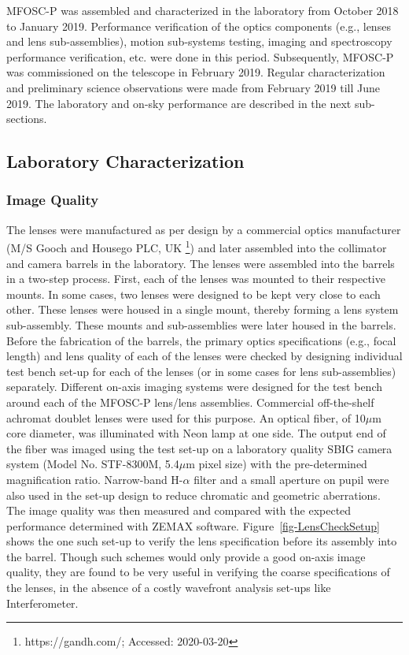 MFOSC-P was assembled and characterized in the laboratory from October 2018 to January 2019. Performance verification of the optics components (e.g., lenses and lens sub-assemblies), motion sub-systems testing, imaging and spectroscopy performance verification, etc. were done in this period. Subsequently, MFOSC-P was commissioned on the telescope in February 2019. Regular characterization and preliminary science observations were made from February 2019 till June 2019. The laboratory and on-sky performance are described in the next sub-sections.



\par
\subsection{Laboratory Characterization} 
\label{subsec-LabCharact}
\par


\par
\subsubsection{Image Quality} 
\label{subsubsec-LabIQ}
\par

The lenses were manufactured as per design by a commercial optics manufacturer (M/S Gooch and Housego PLC, UK \footnote{https://gandh.com/; Accessed: 2020-03-20}) and later assembled into the collimator and camera barrels in the laboratory. The lenses were assembled into the barrels in a two-step process. First, each of the lenses was mounted to their respective mounts. In some cases, two lenses were designed to be kept very close to each other. These lenses were housed in a single mount, thereby forming a lens system sub-assembly.  These mounts and sub-assemblies were later housed in the barrels. Before the fabrication of the barrels, the primary optics specifications (e.g., focal length) and lens quality of each of the lenses were checked by designing individual test bench set-up for each of the lenses (or in some cases for lens sub-assemblies) separately. Different on-axis imaging systems were designed for the test bench around each of the MFOSC-P lens/lens assemblies. Commercial off-the-shelf achromat doublet lenses were used for this purpose. An optical fiber, of 10$\mu$m core diameter, was illuminated with Neon lamp at one side. The output end of the fiber was imaged using the test set-up on a laboratory quality SBIG camera system (Model No. STF-8300M, 5.4$\mu$m pixel size) with the pre-determined magnification ratio. Narrow-band H-$\alpha$ filter and a small aperture on pupil were also used in the set-up design to reduce chromatic and geometric aberrations. The image quality was then measured and compared with the expected performance determined with ZEMAX software. Figure~\ref{fig-LensCheckSetup} shows the one such set-up to verify the lens specification before its assembly into the barrel. Though such schemes would only provide a good on-axis image quality, they are found to be very useful in verifying the coarse specifications of the lenses, in the absence of a costly wavefront analysis set-ups like Interferometer.


